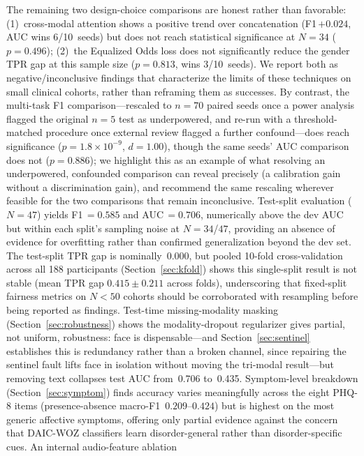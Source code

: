 \documentclass[5p,twocolumn]{elsarticle}
\begin{document}
The remaining two design-choice comparisons are honest rather than
favorable: (1)~cross-modal attention shows a positive trend over
concatenation (F1\,$+0.024$, AUC wins 6/10~seeds) but does not reach
statistical significance at $N{=}34$ ($p{=}0.496$); (2)~the Equalized
Odds loss does not significantly reduce the gender TPR gap at this
sample size ($p{=}0.813$, wins 3/10~seeds). We report both as
negative/inconclusive findings that characterize the limits of these
techniques on small clinical cohorts, rather than reframing them as
successes. By contrast, the multi-task F1 comparison---rescaled to
$n{=}70$ paired seeds once a power analysis flagged the original
$n{=}5$ test as underpowered, and re-run with a threshold-matched
procedure once external review flagged a further confound---does
reach significance ($p{=}1.8{\times}10^{-9}$, $d{=}1.00$), though the
same seeds' AUC comparison does not ($p{=}0.886$); we highlight this
as an example of what resolving an underpowered, confounded
comparison can reveal precisely (a calibration gain without a
discrimination gain), and recommend the same rescaling wherever
feasible for the two comparisons that remain inconclusive.
Test-split evaluation ($N{=}47$) yields F1\,$=0.585$ and
AUC\,$=0.706$, numerically above the dev AUC but within each split's
sampling noise at $N{=}34$/$47$, providing an absence of evidence for
overfitting rather than confirmed generalization beyond the dev set.
The test-split TPR gap is
nominally~0.000, but pooled 10-fold cross-validation across all
188 participants (Section~\ref{sec:kfold}) shows this single-split
result is not stable (mean TPR gap $0.415\pm0.211$ across folds),
underscoring that fixed-split fairness metrics on $N{<}50$ cohorts
should be corroborated with resampling before being reported as
findings. Test-time missing-modality masking
(Section~\ref{sec:robustness}) shows the modality-dropout regularizer
gives partial, not uniform, robustness: face is dispensable---and
Section~\ref{sec:sentinel} establishes this is redundancy rather than a
broken channel, since repairing the sentinel fault lifts face in
isolation without moving the tri-modal result---but
removing text collapses test AUC from~0.706 to~0.435. Symptom-level
breakdown (Section~\ref{sec:symptom}) finds accuracy varies
meaningfully across the eight PHQ-8 items (presence-absence
macro-F1~$0.209$--$0.424$) but is highest on the most generic
affective symptoms, offering only partial evidence against the
concern that DAIC-WOZ classifiers learn disorder-general rather than
disorder-specific cues. An internal audio-feature ablation
\end{document}

